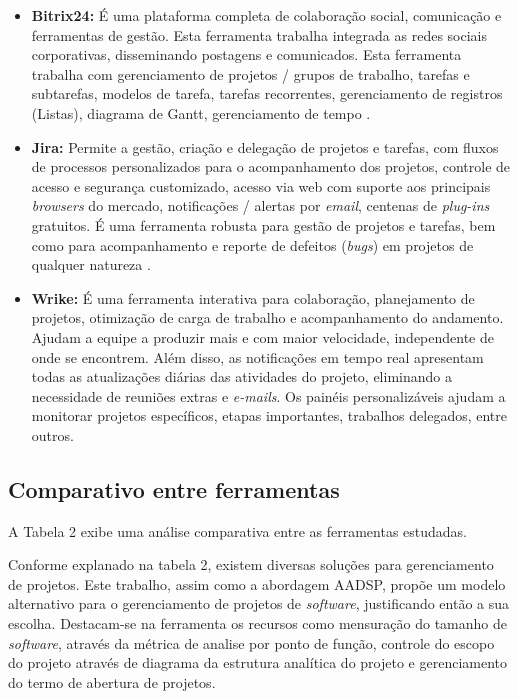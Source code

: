 \documentclass{acm_proc_article-sp}
\begin{document}
\begin{itemize}
\item \textbf{Bitrix24:} É uma plataforma completa de colaboração social, comunicação e ferramentas de gestão. Esta ferramenta trabalha integrada as redes sociais corporativas, disseminando postagens e comunicados. Esta ferramenta trabalha com gerenciamento de projetos / grupos de trabalho, tarefas e subtarefas, modelos de tarefa, tarefas recorrentes, gerenciamento de registros (Listas), diagrama de Gantt, gerenciamento de tempo \cite{bitrix24:ferramenta}.
\item \textbf{Jira:}  Permite a gestão, criação e delegação de projetos e tarefas, com fluxos de processos personalizados para o acompanhamento dos projetos, controle de acesso e segurança customizado, acesso via web com suporte aos principais \textit{browsers} do mercado, notificações / alertas por \textit{email},  centenas de \textit{plug-ins} gratuitos. É uma ferramenta robusta para gestão de projetos e tarefas, bem como para acompanhamento e reporte de defeitos (\textit{bugs}) em projetos de qualquer natureza \cite{jira:ferramenta}.
\item \textbf{Wrike:} É uma ferramenta interativa para colaboração, planejamento de projetos, otimização de carga de trabalho e acompanhamento do andamento. Ajudam a equipe a produzir mais e com maior velocidade, independente de onde se encontrem. Além disso, as notificações em tempo real apresentam todas as atualizações diárias das atividades do projeto, eliminando a necessidade de reuniões extras e \textit{e-mails}. Os painéis personalizáveis ajudam a monitorar projetos específicos, etapas importantes, trabalhos delegados, entre outros.  
\end{itemize}

\subsection{Comparativo entre ferramentas}
 A Tabela 2 exibe uma análise comparativa entre as ferramentas estudadas.

Conforme explanado na tabela 2, existem diversas soluções para gerenciamento de projetos. Este trabalho, assim como a abordagem AADSP, propõe um modelo alternativo para o gerenciamento de projetos de \textit{software}, justificando então a sua escolha. Destacam-se na ferramenta os recursos como mensuração do tamanho de \textit{software}, através da métrica de analise por ponto de função, controle do escopo do projeto através de diagrama da estrutura analítica do projeto e gerenciamento do termo de abertura de projetos. 
\end{document}

